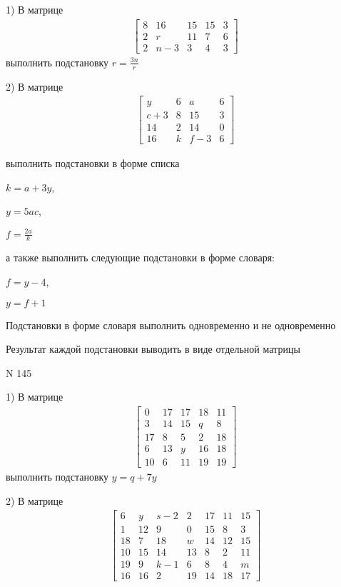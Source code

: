 \documentclass[11pt]{report}
\begin{document}
    1) В матрице
\begin{align*}
\left[\begin{matrix}8 & 16 & 15 & 15 & 3\\2 & r & 11 & 7 & 6\\2 & n - 3 & 3 & 4 & 3\end{matrix}\right]
\end{align*}
выполнить подстановку $r=\frac{3 n}{r}$


    2) В матрице
\begin{align*}
\left[\begin{matrix}y & 6 & a & 6\\c + 3 & 8 & 15 & 3\\14 & 2 & 14 & 0\\16 & k & f - 3 & 6\end{matrix}\right]
\end{align*}

выполнить подстановки в форме списка

$k=a + 3 y$,

$y=5 a c$,

$f=\frac{2 a}{k}$

а также выполнить следующие подстановки в форме словаря:

$f=y - 4$,

$y=f + 1$


    Подстановки в форме словаря выполнить одновременно и не одновременно


    Результат каждой подстановки выводить в виде отдельной матрицы

\newpage
N 145


    1) В матрице
\begin{align*}
\left[\begin{matrix}0 & 17 & 17 & 18 & 11\\3 & 14 & 15 & q & 8\\17 & 8 & 5 & 2 & 18\\6 & 13 & y & 16 & 18\\10 & 6 & 11 & 19 & 19\end{matrix}\right]
\end{align*}
выполнить подстановку $y=q + 7 y$


    2) В матрице
\begin{align*}
\left[\begin{matrix}6 & y & s - 2 & 2 & 17 & 11 & 15\\1 & 12 & 9 & 0 & 15 & 8 & 3\\18 & 7 & 18 & w & 14 & 12 & 15\\10 & 15 & 14 & 13 & 8 & 2 & 11\\19 & 9 & k - 1 & 6 & 8 & 4 & m\\16 & 16 & 2 & 19 & 14 & 18 & 17\end{matrix}\right]
\end{align*}
\end{document}
